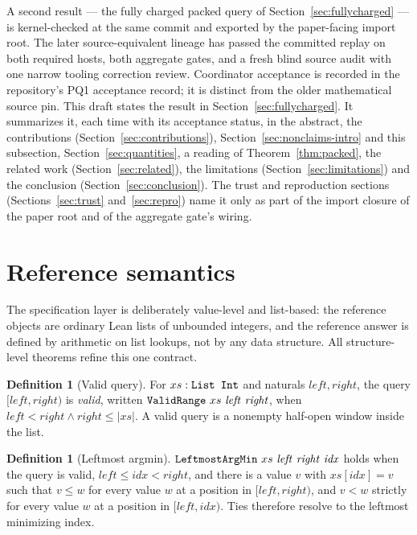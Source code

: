 \documentclass[11pt]{article}
\newcommand{\leanid}[1]{\ifmmode\text{\ttfamily\upshape #1}\else{\def\UrlFont{\ttfamily\upshape}\nolinkurl{#1}}\fi}
\theoremstyle{definition}
\newtheorem{definition}[theorem]{Definition}
\theoremstyle{remark}
\newcommand{\len}[1]{\lvert #1\rvert}
\begin{document}
A second result --- the fully charged packed query of
Section~\ref{sec:fullycharged} --- is kernel-checked at the same commit and
exported by the paper-facing import root. The later source-equivalent lineage has passed the committed replay on both required hosts, both aggregate gates, and a fresh blind source audit with one narrow tooling correction review. Coordinator acceptance is recorded in the repository's PQ1 acceptance record; it is distinct from the older mathematical source pin. This draft
states the result in Section~\ref{sec:fullycharged}. It summarizes it, each
time with its acceptance status, in the abstract, the contributions
(Section~\ref{sec:contributions}), Section~\ref{sec:nonclaims-intro} and this
subsection, Section~\ref{sec:quantities}, a reading of
Theorem~\ref{thm:packed}, the related work (Section~\ref{sec:related}), the
limitations (Section~\ref{sec:limitations}) and the conclusion
(Section~\ref{sec:conclusion}). The trust and reproduction sections
(Sections~\ref{sec:trust} and~\ref{sec:repro}) name it only as part of the
import closure of the paper root and of the aggregate gate's wiring.

\section{Reference semantics}\label{sec:semantics}

The specification layer is deliberately value-level and list-based: the
reference objects are ordinary Lean lists of unbounded integers, and the
reference answer is defined by arithmetic on list lookups, not by any data
structure. All structure-level theorems refine this one contract.

\begin{definition}[Valid query]\label{def:validrange}
For $xs : \leanid{List Int}$ and naturals $\mathit{left}, \mathit{right}$,
the query $[\mathit{left}, \mathit{right})$ is \emph{valid}, written
$\leanid{ValidRange}\ xs\ \mathit{left}\ \mathit{right}$, when
$\mathit{left} < \mathit{right} \wedge \mathit{right} \le \len{xs}$.
A valid query is a nonempty half-open window inside the list.
\end{definition}

\begin{definition}[Leftmost argmin]\label{def:leftmostargmin}
$\leanid{LeftmostArgMin}\ xs\ \mathit{left}\ \mathit{right}\ \mathit{idx}$
holds when the query is valid, $\mathit{left} \le \mathit{idx} <
\mathit{right}$, and there is a value $v$ with $xs[\mathit{idx}] = v$ such
that $v \le w$ for every value $w$ at a position in
$[\mathit{left}, \mathit{right})$, and $v < w$ strictly for every value $w$
at a position in $[\mathit{left}, \mathit{idx})$. Ties therefore resolve to
the leftmost minimizing index.
\end{definition}
\end{document}
